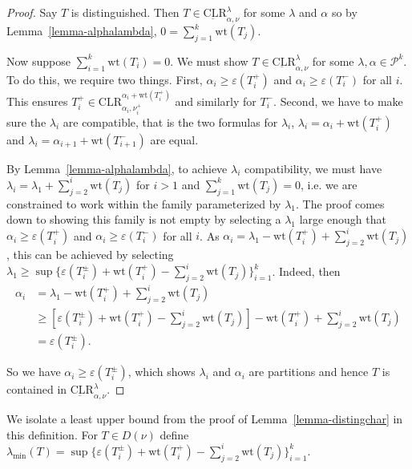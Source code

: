 \documentclass[ALCO,Unicode]{cedram}
\newcommand{\Par}{\mathcal{P}}
\newcommand{\wt}{\text{wt}}
\newcommand{\CLR}{\text{CLR}}
\begin{document}
\begin{proof}
    Say $T$ is distinguished. Then $T \in \underbar{\CLR}^\lambda_{\alpha, \nu}$ for some $\lambda$ and $\alpha$ so by Lemma~\ref{lemma-alphalambda}, $0 = \sum_{j=1}^{k} \wt(T_j)$.

    Now suppose $\sum_{i=1}^k \wt(T_i) = 0$. We must show $T \in \underbar{\CLR}^\lambda_{\alpha, \nu}$ for some $\lambda, \alpha \in \Par^k$. To do this, we require two things. First, $\alpha_i \geq \varepsilon(T_i^+)$ and $\alpha_i \geq \varepsilon(T_i^-)$ for all $i$. This ensures $T_i^+ \in \CLR_{\alpha_i, \nu_i^+}^{\alpha_i+\wt(T_i^+)}$ and similarly for $T_i^-$. Second, we have to make sure the $\lambda_i$ are compatible, that is the two formulas for $\lambda_i$, $\lambda_i = \alpha_i + \wt(T_i^+)$ and $\lambda_i = \alpha_{i+1}+ \wt(T_{i+1}^-)$ are equal.

    By Lemma~\ref{lemma-alphalambda}, to achieve $\lambda_i$ compatibility, we must have $\lambda_i = \lambda_1 + \sum_{j=2}^{i} \wt(T_j)$ for $i > 1$ and $\sum_{j=1}^k \wt(T_j) = 0$, i.e. we are constrained to work within the family parameterized by $\lambda_1$. The proof comes down to showing this family is not empty by selecting a $\lambda_1$ large enough that $\alpha_i \geq \varepsilon(T_i^+)$ and $\alpha_i \geq \varepsilon(T_i^-)$ for all $i$. As $\alpha_i = \lambda_1 - \wt(T_i^+) + \sum_{j=2}^{i} \wt(T_j)$, this can be achieved by selecting $\lambda_1 \geq \sup \{\varepsilon(T_i^\pm) + \wt(T_i^+) - \sum_{j=2}^{i} \wt(T_j)\}_{i=1}^k$. Indeed, then 
\begin{align*}
\alpha_i &= \lambda_1 - \wt(T_i^+) + \sum_{j=2}^{i} \wt(T_j)\\
&\geq [\varepsilon(T_i^\pm) + \wt(T_i^+) - \sum_{j=2}^{i} \wt(T_j)] - \wt(T_i^+) + \sum_{j=2}^{i} \wt(T_j)\\
&= \varepsilon(T_i^\pm).
\end{align*}
    
    So we have $\alpha_i \geq \varepsilon(T_i^\pm)$, which shows $\lambda_i$ and $\alpha_i$ are partitions and hence $T$ is contained in $\underbar{\CLR}^\lambda_{\alpha, \nu}$.

    \end{proof}

\begin{defn}
    We isolate a least upper bound from the proof of Lemma~\ref{lemma-distingchar} in this definition. For $T \in D(\nu)$ define $\lambda_{\min}(T) = \sup \{\varepsilon(T_i^\pm) + \wt(T_i^+) - \sum_{j=2}^{i} \wt(T_j)\}_{i=1}^k$.
\end{defn}
\end{document}
